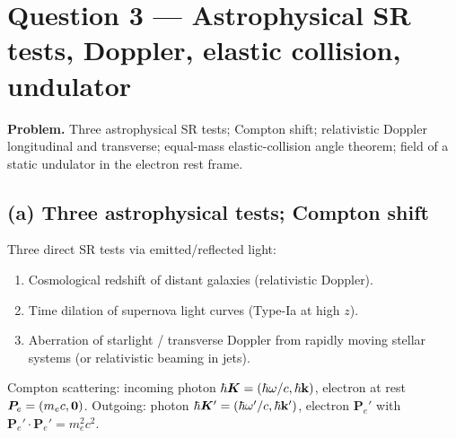\documentclass[11pt]{article}
\begin{document}
\section*{Question 3 --- Astrophysical SR tests, Doppler, elastic collision, undulator}

\textbf{Problem.} Three astrophysical SR tests; Compton shift; relativistic Doppler longitudinal and transverse; equal-mass elastic-collision angle theorem; field of a static undulator in the electron rest frame.

\subsection*{(a) Three astrophysical tests; Compton shift}

Three direct SR tests via emitted/reflected light:
\begin{enumerate}
\item Cosmological redshift of distant galaxies (relativistic Doppler).
\item Time dilation of supernova light curves (Type-Ia at high $z$).
\item Aberration of starlight / transverse Doppler from rapidly moving stellar systems (or relativistic beaming in jets).
\end{enumerate}

Compton scattering: incoming photon $\hbar\bm K=(\hbar\omega/c,\hbar\vb k)$, electron at rest $\bm P_e=(m_e c,\vb 0)$. Outgoing: photon $\hbar\bm K'=(\hbar\omega'/c,\hbar\vb k')$, electron $\bm P_e'$ with $\bm P_e'\cdot\bm P_e' = m_e^2c^2$.
\end{document}
